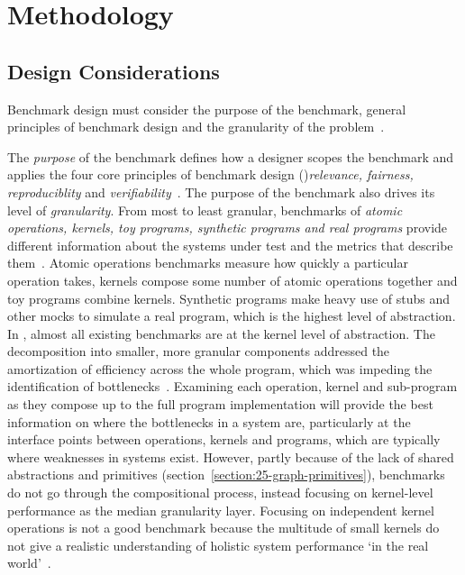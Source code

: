 \section{Methodology}
\label{section:42-GAI-Methodology}

\subsection{Design Considerations}
Benchmark design must consider the purpose of the benchmark, general principles of benchmark design and the granularity of the problem~\cite{Carpinetti2002}.

The \textit{purpose} of the benchmark defines how a designer scopes the benchmark and applies the four core principles of benchmark design ()\textit{relevance, fairness, reproduciblity} and \textit{verifiability}~\cite{Huppler2009, Kistowski2015}. 
The purpose of the benchmark also drives its level of \textit{granularity}. 
From most to least granular, benchmarks of \textit{atomic operations, kernels, toy programs, synthetic programs and real programs} provide different information about the systems under test and the metrics that describe them~\cite{Hennessy2019}.
Atomic operations benchmarks measure how quickly a particular operation takes, kernels compose some number of atomic operations together and toy programs combine kernels. 
Synthetic programs make heavy use of stubs and other mocks to simulate a real program, which is the highest level of abstraction. 
In \gai, almost all existing benchmarks are at the kernel level of abstraction.
The decomposition into smaller, more granular components addressed the amortization of efficiency across the whole program, which was impeding the identification of bottlenecks~\cite{Saavedra1996}.
Examining each operation, kernel and sub-program as they compose up to the full program implementation will provide the best information on where the bottlenecks in a system are, particularly at the interface points between operations, kernels and programs, which are typically where weaknesses in systems exist. 
However, partly because of the lack of shared abstractions and primitives (section~\ref{section:25-graph-primitives}), benchmarks do not go through the compositional process, instead focusing on kernel-level performance as the median granularity layer.
Focusing on independent kernel operations is not a good benchmark because the multitude of small kernels do not give a realistic understanding of holistic system performance `in the real world'~\cite{Hennessy2019}.

